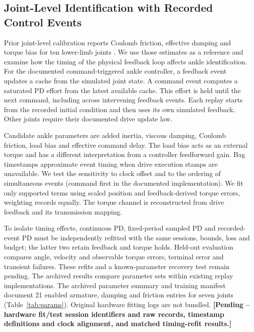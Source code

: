 \documentclass[letterpaper,10pt,conference]{ieeeconf}
\newcommand{\pending}[1]{\textcolor{red!65!black}{\textbf{[Pending -- #1]}}}
\begin{document}
\subsection{Joint-Level Identification with Recorded Control Events}\label{sec:identification}
Prior joint-level calibration reports Coulomb friction, effective damping and torque bias for ten lower-limb joints \cite{rti}. We use those estimates as a reference and examine how the timing of the physical feedback loop affects ankle identification. For the documented command-triggered ankle controller, a feedback event updates a cache from the simulated joint state. A command event computes a saturated PD effort from the latest available cache. This effort is held until the next command, including across intervening feedback events. Each replay starts from the recorded initial condition and then uses its own simulated feedback. Other joints require their documented drive update law.

Candidate ankle parameters are added inertia, viscous damping, Coulomb friction, load bias and effective command delay. The load bias acts as an external torque and has a different interpretation from a controller feedforward gain. Bag timestamps approximate event timing when drive execution stamps are unavailable. We test the sensitivity to clock offset and to the ordering of simultaneous events (command first in the documented implementation). We fit only supported terms using scaled position and feedback-derived torque errors, weighting records equally. The torque channel is reconstructed from drive feedback and its transmission mapping.

To isolate timing effects, continuous PD, fixed-period sampled PD and recorded-event PD must be independently refitted with the same sessions, bounds, loss and budget; the latter two retain feedback and torque holds. Held-out evaluation compares angle, velocity and observable torque errors, terminal error and transient failures. These refits and a known-parameter recovery test remain pending. The archived results compare parameter sets within existing replay implementations. The archived parameter summary and training manifest document 21 enabled armature, damping and friction entries for seven joints (Table~\ref{tab:params}). Original hardware fitting logs are not bundled. \pending{hardware fit/test session identifiers and raw records, timestamp definitions and clock alignment, and matched timing-refit results.}
\end{document}
